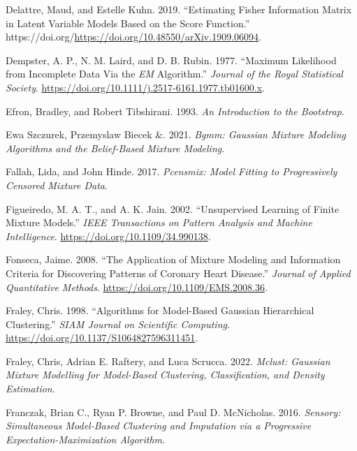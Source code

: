 \begin{CSLReferences}{1}{0}
\leavevmode{}%
Delattre, Maud, and Estelle Kuhn. 2019. {``Estimating {Fisher Information Matrix} in {Latent Variable Models} Based on the {Score Function}.''} https://doi.org/\url{https://doi.org/10.48550/arXiv.1909.06094}.

\leavevmode{}%
Dempster, A. P., N. M. Laird, and D. B. Rubin. 1977. {``Maximum {Likelihood} from {Incomplete Data Via} the {\emph{EM}} {Algorithm}.''} \emph{Journal of the Royal Statistical Society}. \url{https://doi.org/10.1111/j.2517-6161.1977.tb01600.x}.

\leavevmode{}%
Efron, Bradley, and Robert Tibshirani. 1993. \emph{An {Introduction} to the {Bootstrap}}.

\leavevmode{}%
Ewa Szczurek, Przemyslaw Biecek \&. 2021. \emph{Bgmm: Gaussian Mixture Modeling Algorithms and the Belief-Based Mixture Modeling}.

\leavevmode{}%
Fallah, Lida, and John Hinde. 2017. \emph{Pcensmix: Model Fitting to Progressively Censored Mixture Data}.

\leavevmode{}%
Figueiredo, M. A. T., and A. K. Jain. 2002. {``Unsupervised Learning of Finite Mixture Models.''} \emph{IEEE Transactions on Pattern Analysis and Machine Intelligence}. \url{https://doi.org/10.1109/34.990138}.

\leavevmode{}%
Fonseca, Jaime. 2008. {``The Application of Mixture Modeling and Information Criteria for Discovering Patterns of Coronary Heart Disease.''} \emph{Journal of Applied Quantitative Methods}. \url{https://doi.org/10.1109/EMS.2008.36}.

\leavevmode{}%
Fraley, Chris. 1998. {``Algorithms for {Model-Based Gaussian Hierarchical Clustering}.''} \emph{SIAM Journal on Scientific Computing}. \url{https://doi.org/10.1137/S1064827596311451}.

\leavevmode{}%
Fraley, Chris, Adrian E. Raftery, and Luca Scrucca. 2022. \emph{Mclust: Gaussian Mixture Modelling for Model-Based Clustering, Classification, and Density Estimation}.

\leavevmode{}%
Franczak, Brian C., Ryan P. Browne, and Paul D. McNicholas. 2016. \emph{Sensory: Simultaneous Model-Based Clustering and Imputation via a Progressive Expectation-Maximization Algorithm}.


\end{CSLReferences}
